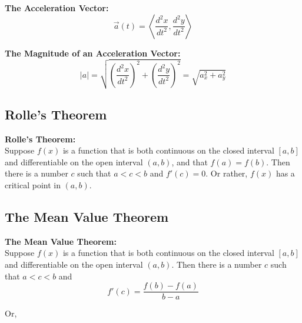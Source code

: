 \documentclass{article}
\begin{document}
            \noindent \color{purple} \textbf{The Acceleration Vector:} \color{black} \\

            \begin{equation*}
                \overrightarrow{a}(t) = \left\langle\frac{d^2x}{dt^2},\frac{d^2y}{dt^2}\right\rangle
            \end{equation*}

            \noindent \color{purple} \textbf{The Magnitude of an Acceleration Vector:} \color{black} \\

            \begin{equation*}
                |a| = \sqrt{\left(\frac{d^2x}{dt^2}\right)^2+\left(\frac{d^2y}{dt^2}\right)^2} = \sqrt{a^2_x+a^2_y}
            \end{equation*}


        \subsection{Rolle's Theorem}
            \color{purple} \textbf{Rolle's Theorem:} \color{black} \\
            \noindent Suppose $f(x)$ is a function that is both continuous on the closed interval
            $[a,b]$ and differentiable on the open interval $(a,b)$, and that $f(a)=f(b)$.
            Then there is a number $c$ such that $a<c<b$ and $f'(c)=0$. Or rather, $f(x)$ has a
            critical point in $(a,b)$. \\


        \subsection{The Mean Value Theorem}
            \color{purple} \textbf{The Mean Value Theorem:} \color{black} \\
            \noindent Suppose $f(x)$ is a function that is both continuous on the closed interval
            $[a,b]$ and differentiable on the open interval $(a,b)$. Then there is a number
            $c$ such that $a<c<b$ and \\

            \begin{equation*}
                f'(c) = \frac{f(b)-f(a)}{b-a}
            \end{equation*}

            \noindent Or, \\
\end{document}
